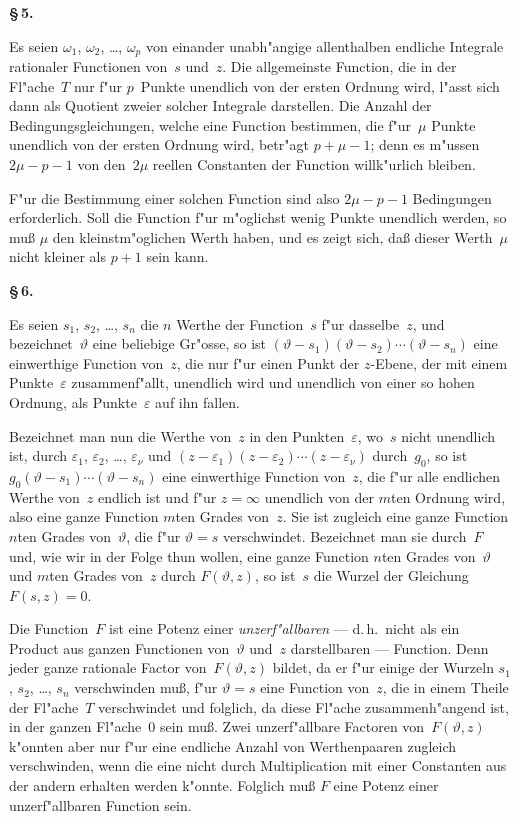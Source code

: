 \documentclass[12pt,a4paper]{article}
\begin{document}
\medskip
\textbf{\S\,5.}

Es seien $\omega_1$, $\omega_2$, \ldots, $\omega_p$ von einander unabh"angige allenthalben
endliche Integrale rationaler Functionen von~$s$ und~$z$. Die allgemeinste
Function, die in der Fl"ache~$T$ nur f"ur $p$~Punkte unendlich von der
ersten Ordnung wird, l"asst sich dann als Quotient zweier solcher
Integrale darstellen. Die Anzahl der Bedingungsgleichungen, welche
eine Function bestimmen, die f"ur~$\mu$ Punkte unendlich von der ersten
Ordnung wird, betr"agt $p + \mu - 1$; denn es m"ussen $2\mu - p - 1$
von den~$2\mu$ reellen Constanten der Function willk"urlich bleiben.

F"ur die Bestimmung einer solchen Function sind also $2\mu - p - 1$
Bedingungen erforderlich. Soll die Function f"ur m"oglichst wenig Punkte
unendlich werden, so mu\ss{} $\mu$ den kleinstm"oglichen Werth haben, und
es zeigt sich, da\ss{} dieser Werth~$\mu$ nicht kleiner als $p + 1$ sein kann.

\medskip
\textbf{\S\,6.}

Es seien $s_1$, $s_2$, \ldots, $s_n$ die $n$ Werthe der Function~$s$ f"ur dasselbe~$z$,
und bezeichnet~$\vartheta$ eine beliebige Gr"osse, so ist
$(\vartheta - s_1)(\vartheta - s_2)\cdots(\vartheta - s_n)$ eine einwerthige Function von~$z$,
die nur f"ur einen Punkt der $z$-Ebene, der mit einem Punkte~$\varepsilon$
zusammenf"allt, unendlich wird und unendlich von einer so hohen
Ordnung, als Punkte~$\varepsilon$ auf ihn fallen.

Bezeichnet man nun die Werthe von~$z$ in den Punkten~$\varepsilon$, wo~$s$ nicht
unendlich ist, durch $\varepsilon_1$, $\varepsilon_2$, \ldots, $\varepsilon_\nu$ und
$(z - \varepsilon_1)(z - \varepsilon_2)\cdots(z - \varepsilon_\nu)$ durch~$g_0$, so ist
$g_0(\vartheta - s_1)\cdots(\vartheta - s_n)$ eine einwerthige Function von~$z$, die
f"ur alle endlichen Werthe von~$z$ endlich ist und f"ur $z = \infty$ unendlich
von der $m$ten Ordnung wird, also eine ganze Function $m$ten Grades
von~$z$. Sie ist zugleich eine ganze Function $n$ten Grades von~$\vartheta$,
die f"ur $\vartheta = s$ verschwindet. Bezeichnet man sie durch~$F$ und, wie
wir in der Folge thun wollen, eine ganze Function $n$ten Grades von~$\vartheta$
und $m$ten Grades von~$z$ durch $F(\vartheta, z)$, so ist~$s$ die Wurzel der
Gleichung $F(s,z) = 0$.

Die Function~$F$ ist eine Potenz einer \emph{unzerf"allbaren} --- d.\,h.\ nicht
als ein Product aus ganzen Functionen von~$\vartheta$ und~$z$ darstellbaren ---
Function. Denn jeder ganze rationale Factor von~$F(\vartheta,z)$ bildet, da er
f"ur einige der Wurzeln $s_1$, $s_2$, \ldots, $s_n$ verschwinden mu\ss{}, f"ur
$\vartheta = s$ eine Function von~$z$, die in einem Theile der Fl"ache~$T$
verschwindet und folglich, da diese Fl"ache zusammenh"angend ist, in
der ganzen Fl"ache~$0$ sein mu\ss{}. Zwei unzerf"allbare Factoren
von~$F(\vartheta,z)$ k"onnten aber nur f"ur eine endliche Anzahl von Werthenpaaren
zugleich verschwinden, wenn die eine nicht durch Multiplication mit einer
Constanten aus der andern erhalten werden k"onnte. Folglich mu\ss{} $F$
eine Potenz einer unzerf"allbaren Function sein.
\end{document}
